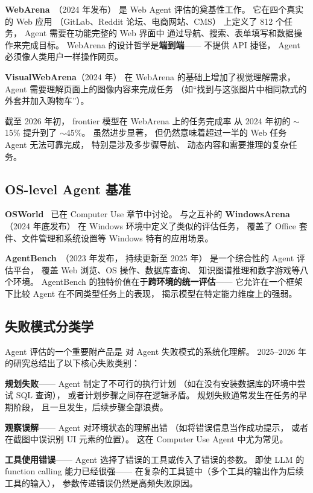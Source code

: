 \textbf{WebArena}~\cite{zhou2024webarena}（2024 年发布）
是 Web Agent 评估的奠基性工作。
它在四个真实的 Web 应用
（GitLab、Reddit 论坛、电商网站、CMS）
上定义了 812 个任务，
Agent 需要在功能完整的 Web 界面中
通过导航、搜索、表单填写和数据操作来完成目标。
WebArena 的设计哲学是\textbf{端到端}——
不提供 API 捷径，
Agent 必须像人类用户一样操作网页。

\textbf{VisualWebArena}（2024 年）
在 WebArena 的基础上增加了视觉理解需求，
Agent 需要理解页面上的图像内容来完成任务
（如“找到与这张图片中相同款式的外套并加入购物车”）。

截至 2026 年初，
frontier 模型在 WebArena 上的任务完成率
从 2024 年初的 $\sim$15\% 提升到了 $\sim$45\%。
虽然进步显著，
但仍然意味着超过一半的 Web 任务
Agent 无法可靠完成，
特别是涉及多步骤导航、
动态内容和需要推理的复杂任务。

\subsection{OS-level Agent 基准}

\textbf{OSWorld}~\cite{xie2024osworld}
已在 Computer Use 章节中讨论。
与之互补的 \textbf{WindowsArena}（2024 年底发布）
在 Windows 环境中定义了类似的评估任务，
覆盖了 Office 套件、文件管理和系统设置等
Windows 特有的应用场景。

\textbf{AgentBench}~\cite{liu2023agentbench}（2023 年发布，
持续更新至 2025 年）
是一个综合性的 Agent 评估平台，
覆盖 Web 浏览、OS 操作、数据库查询、
知识图谱推理和数字游戏等八个环境。
AgentBench 的独特价值在于\textbf{跨环境的统一评估}——
它允许在一个框架下比较
Agent 在不同类型任务上的表现，
揭示模型在特定能力维度上的强弱。

\subsection{失败模式分类学}

Agent 评估的一个重要附产品是
对 Agent 失败模式的系统化理解。
2025--2026 年的研究总结出了以下核心失败类别：

\textbf{规划失败}——
Agent 制定了不可行的执行计划
（如在没有安装数据库的环境中尝试 SQL 查询），
或者计划步骤之间存在逻辑矛盾。
规划失败通常发生在任务的早期阶段，
且一旦发生，后续步骤全部浪费。

\textbf{观察误解}——
Agent 对环境状态的理解出错
（如将错误信息当作成功提示，
或者在截图中误识别 UI 元素的位置）。
这在 Computer Use Agent 中尤为常见。

\textbf{工具使用错误}——
Agent 选择了错误的工具或传入了错误的参数。
即使 LLM 的 function calling 能力已经很强——
在复杂的工具链中（多个工具的输出作为后续工具的输入），
参数传递错误仍然是高频失败原因。


